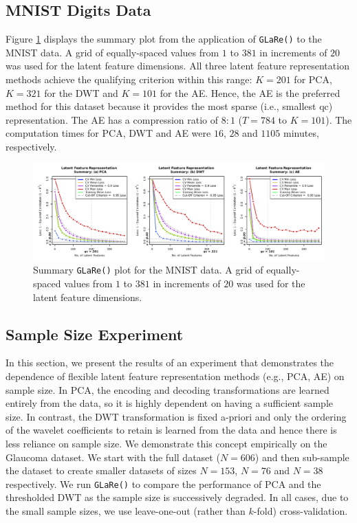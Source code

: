 \subsection{MNIST Digits Data}\label{sec:mnist-reults}

Figure \ref{fig:mnist-results} displays the summary plot from the application of \texttt{GLaRe()} to the MNIST data.
A grid of equally-spaced values from $1$ to $381$ in increments of $20$ was used for the latent feature dimensions.
All three latent feature representation methods achieve the qualifying criterion within this range: $K = 201$ for PCA, $K = 321$ for the DWT and $K = 101$ for the AE.
Hence, the AE is the preferred method for this dataset because it provides the most sparse (i.e., smallest qc) representation.
The AE has a compression ratio of $8:1$ ($T = 784$ to $K = 101$).
The computation times for PCA, DWT and AE were $16$, $28$ and $1105$ minutes, respectively.

\begin{figure}
    \centering
    \includegraphics[width=1\textwidth]{figures/mnist-results.pdf}
    \caption{Summary \texttt{GLaRe()} plot for the MNIST data. A grid of equally-spaced values from $1$ to $381$ in increments of $20$ was used for the latent feature dimensions.}
    \label{fig:mnist-results}
\end{figure}

\subsection{Sample Size Experiment}\label{sec:sample-size-experiment}

In this section, we present the results of an experiment that demonstrates the dependence of flexible latent feature representation methods (e.g., PCA, AE) on sample size.
In PCA, the encoding and decoding transformations are learned entirely from the data, so it is highly dependent on having a sufficient sample size.
In contrast, the DWT transformation is fixed a-priori and only the ordering of the wavelet coefficients to retain is learned from the data and hence there is less reliance on sample size.
We demonstrate this concept empirically on the Glaucoma dataset. 
We start with the full dataset ($N=606$) and then sub-sample the dataset to create smaller datasets of sizes $N=153$, $N=76$ and $N=38$ respectively.
We run \texttt{GLaRe()} to compare the performance of PCA and the thresholded DWT as the sample size is successively degraded.
In all cases, due to the small sample sizes, we use leave-one-out (rather than $k$-fold) cross-validation.

